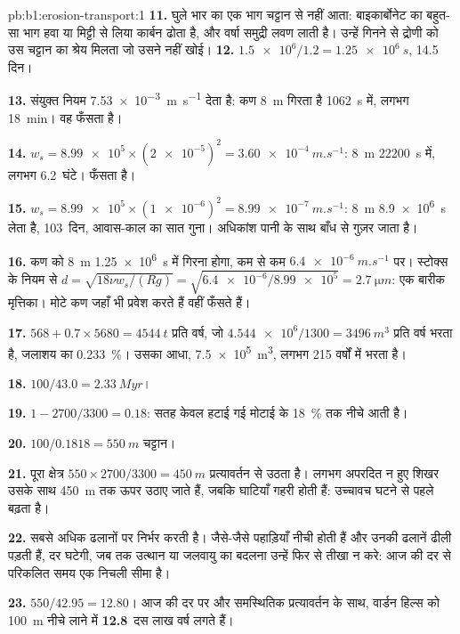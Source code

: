\begin{solution}{pb:b1:erosion-transport:1}
\textbf{11.} घुले भार का एक भाग चट्टान से नहीं आता: बाइकार्बोनेट का बहुत-सा भाग हवा या मिट्टी से लिया कार्बन ढोता है, और वर्षा समुद्री लवण लाती है। उन्हें गिनने से द्रोणी को उस चट्टान का श्रेय मिलता जो उसने नहीं खोई।
\textbf{12.} $\num{1.5e6}/1.2 = \qty{1.25e6}{s}$, \num{14.5} दिन।

\textbf{13.} संयुक्त नियम \qty{7.53e-3}{m.s^{-1}} देता है: कण \qty{8}{m} गिरता है
\qty{1062}{s} में, लगभग \qty{18}{min}। वह फँसता है।

\textbf{14.} $w_s = \num{8.99e5} \times (\num{2e-5})^2 =
\qty{3.60e-4}{m.s^{-1}}$: \qty{8}{m} \qty{22200}{s} में, लगभग \num{6.2}~घंटे। फँसता है।

\textbf{15.} $w_s = \num{8.99e5} \times (\num{1e-6})^2 =
\qty{8.99e-7}{m.s^{-1}}$: \qty{8}{m} \qty{8.9e6}{s} लेता है, \num{103}~दिन, आवास-काल का सात गुना। अधिकांश पानी के साथ बाँध से गुज़र जाता है।

\textbf{16.} कण को \qty{8}{m} \qty{1.25e6}{s} में गिरना होगा, कम से कम
$\qty{6.4e-6}{m.s^{-1}}$ पर। स्टोक्स के नियम से $d = \sqrt{18\nu
w_s/(Rg)} = \sqrt{\num{6.4e-6}/\num{8.99e5}} = \qty{2.7}{\micro m}$: एक बारीक
मृत्तिका। मोटे कण जहाँ भी प्रवेश करते हैं वहीं फँसते हैं।

\textbf{17.} $568 + 0.7 \times 5680 = \qty{4544}{t}$ प्रति वर्ष, जो
$\num{4.544e6}/1300 = \qty{3496}{m^3}$ प्रति वर्ष भरता है, जलाशय का \qty{0.233}{\percent}। उसका आधा, \qty{7.5e5}{m^3}, लगभग \num{215} वर्षों में भरता है।

\textbf{18.} $100/43.0 = \qty{2.33}{Myr}$।

\textbf{19.} $1 - 2700/3300 = 0.18$: सतह केवल हटाई गई मोटाई के
\qty{18}{\percent} तक नीचे आती है।

\textbf{20.} $100/0.1818 = \qty{550}{m}$ चट्टान।

\textbf{21.} पूरा क्षेत्र $550 \times 2700/3300 = \qty{450}{m}$ प्रत्यावर्तन से उठता है। लगभग अपरदित न हुए शिखर उसके साथ \qty{450}{m} तक ऊपर उठाए जाते हैं, जबकि घाटियाँ गहरी होती हैं: उच्चावच घटने से पहले बढ़ता है।

\textbf{22.}  सबसे अधिक ढलानों पर निर्भर करती है। जैसे-जैसे पहाड़ियाँ नीची होती हैं और उनकी ढलानें ढीली पड़ती हैं, दर घटेगी, जब तक उत्थान या जलवायु का बदलना उन्हें फिर से तीखा न करे: आज की दर से परिकलित समय एक निचली सीमा है।

\textbf{23.} $550/42.95 = 12.80$। आज की दर पर और समस्थितिक प्रत्यावर्तन के साथ, वार्डन हिल्स को \qty{100}{m} नीचे लाने में \textbf{12.8}~दस लाख वर्ष लगते हैं।
\end{solution}
